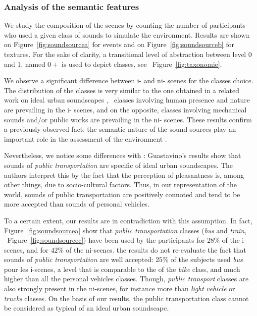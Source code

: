 \documentclass[twoside,twocolumn]{article}
\begin{document}
\subsubsection*{Analysis of the semantic features}

We study the composition of the scenes by counting the number of participants who used a given class of sounds to simulate the environment. Results are shown on Figure~\ref{fig:soundsourcea} for events and on Figure~\ref{fig:soundsourceb} for textures. For the sake of clarity, a transitional level of abstraction between level 0 and 1, named $0+$ is used to depict classes, see ~Figure~\ref{fig:taxonomie}.

We observe a significant difference between i- and ni- scenes for the classes choice. The distribution of the classes is very similar to the one obtained in a related work on ideal urban soundscapes \cite{guastavino2006ideal}, \ie~classes involving human presence and nature are prevailing in the i- scenes, and on the opposite, classes involving mechanical sounds and/or public works are prevailing in the ni- scenes. These results confirm a previously observed fact: the semantic nature of the sound sources play an important role in the assessment of the environment \cite{raimbault2005urban,dubois2006cognitive}.

Nevertheless, we notice some differences with \cite{guastavino2006ideal}: Guastavino’s results show that sounds of \emph{public transportation} are specific of ideal urban soundscapes. The authors interpret this by the fact that the perception of pleasantness is, among other things, due to socio-cultural factors. Thus, in our representation of the world, sounds of public transportation are positively connoted and tend to be more accepted than sounds of personal vehicles.

To a certain extent, our results are in contradiction with this assumption. In fact,  Figure~\ref{fig:soundsourcea} show that \emph{public transportation} classes (\emph{bus} and \emph{train}, \cf~Figure~\ref{fig:soundsourcec}) have been used by the participants for $28\%$ of the i-scenes, and for $42\%$ of the ni-scenes. the results do not re-evaluate the fact that sounds of \emph{public transportation} are well accepted: $25\%$ of the subjects used \emph{bus} pour les i-scenes, a level that is comparable to the of the \emph{bike} class, and much higher than all the personal vehicles classes. Though, \emph{public transport} classes are also strongly present in the ni-scenes, for instance more than \emph{light vehicle} or \emph{trucks} classes. On the basis of our results, the public transportation class cannot be considered as typical of an ideal urban soundscape.
\end{document}
